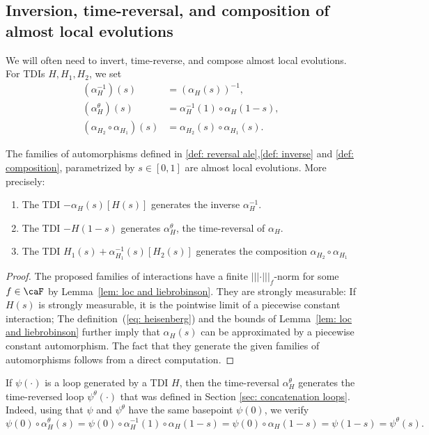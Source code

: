 \subsection{Inversion, time-reversal, and composition of almost local evolutions}\label{sec:composition}



We will often need to invert, time-reverse, and compose almost local evolutions. For TDIs $H,H_1,H_2$, we set
\begin{align}
	(\alpha_H^{-1})(s) &= (\alpha_H(s))^{-1},\label{def: inverse} \\
	(\alpha^{\theta}_H)(s) & = \alpha^{-1}_H(1)\circ \alpha_H(1-s), \label{def: reversal ale} \\
	(\alpha_{H_2}\circ\alpha_{H_1})(s) &= \alpha_{H_2}(s)\circ\alpha_{H_1}(s).  \label{def: composition}
\end{align}

\begin{lemma}\label{lem: manipulation of evolutions}
	The families of automorphisms defined in \eqref{def: reversal ale},\eqref{def: inverse} and \eqref{def: composition}, parametrized by $s\in [0,1]$ are almost local evolutions. More precisely: 
	\begin{enumerate}
		\item The TDI $-\alpha_H(s)[H(s)]$ generates the inverse $\alpha_H^{-1}$.
		\item  The TDI $-H(1-s)$ generates  $\alpha^{\theta}_H$, the time-reversal of $\alpha_H$. 
		\item The TDI $H_1(s)+\alpha_{H_1}^{-1}(s)[H_2(s)]$ generates the composition $ \alpha_{H_2}\circ\alpha_{H_1}$
	\end{enumerate}
\end{lemma}
\begin{proof}
	The proposed families of interactions have a finite $|||\cdot|||_{f}$-norm for some $f\in\caF$ by Lemma~\ref{lem: loc and liebrobinson}. They are strongly measurable: If $H(s)$ is strongly measurable, it is the pointwise limit of a piecewise constant interaction; The definition~(\ref{eq: heisenberg}) and the bounds of Lemma~\ref{lem: loc and liebrobinson} further imply that $\alpha_H(s)$ can be approximated by a piecewise constant automorphism. The fact that they generate the given families of automorphisms follows from a direct computation.
\end{proof}
If $\psi(\cdot)$ is a loop generated by a TDI $H$, then the time-reversal $\alpha^{\theta}_H$ generates the time-reversed loop ${\psi^{\theta}}(\cdot)$ that was defined in Section \ref{sec: concatenation loops}. 
Indeed, using that $\psi$ and $\psi^\theta$ have the same basepoint $\psi(0)$, we verify
$$
{\psi}(0)\circ \alpha^{\theta}_H(s)= {\psi}(0)\circ    \alpha^{-1}_H(1)\circ \alpha_H(1-s) =  {\psi}(0)\circ  \alpha_H(1-s)= \psi(1-s)=\psi^\theta(s). 
$$


